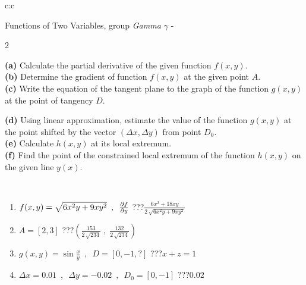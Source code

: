 \documentclass[10pt]{report}
\begin{document}
\begin{tabular}{c:c}
\begin{minipage}[c][104.5mm][t]{0.5\linewidth}
\begin{center}
\vspace{7mm}
{\huge \LARGE Functions of Two Variables, group \textit{Gamma $\gamma$} -}\\[5mm]
\begin{minipage}{0.95\linewidth}
\begin{center}
{\small \begin{multicols}{2} \raggedright
\textbf{(a)} Calculate the partial derivative of the given function \(f(x,y)\). \\[1mm]
\textbf{(b)} Determine the gradient of function \(f(x,y)\) at the given point \(A\). \\[1mm]
\textbf{(c)} Write the equation of the tangent plane to the graph of the function \(g(x,y)\) at the point of tangency \(D\). \par \columnbreak
\textbf{(d)} Using linear approximation, estimate the value of the function \(g(x,y)\) at the point shifted by the vector \((\Delta x, \Delta y)\) from point \(D_0\). \\[1mm]
\textbf{(e)} Calculate \(h(x,y)\) at its local extremum. \\[1mm]
\textbf{(f)} Find the point of the constrained local extremum of the function \(h(x,y)\) on the given line \(y(x)\). \\[1mm]
\end{multicols}
}
\end{center}
\end{minipage}
\\[4mm]
\begin{minipage}{0.79\linewidth}
\begin{center}
\begin{varwidth}{\linewidth}
\begin{enumerate}
\normalsizerr
\item $f(x,y) = \sqrt{6x^2y + 9xy^2}\enspace , \enspace \pdv{f}{y}$\quad \dotfill\; ???\;\dotfill \quad $\frac{6x^2+18xy}{2\,\sqrt{6x^2y+9xy^2}}$
\item $A = [2, 3]$\quad \dotfill\; ???\;\dotfill \quad $\left( \frac{153}{2\,\sqrt{234}} \;,\; \frac{132}{2\,\sqrt{234}} \right)$
\item $g(x,y) = \sin\frac{x}{y} \enspace , \enspace D = [0, -1, ?]$\quad \dotfill\; ???\;\dotfill \quad $x+z=1$
\item $\Delta x = {0.01} \enspace,\enspace \Delta y = {-0.02} \enspace,\enspace D_0 = [0,-1]$\quad \dotfill\; ???\;\dotfill \quad $0.02$

\end{enumerate}
\end{varwidth}
\end{center}
\end{minipage}
\end{center}
\end{minipage}
\end{tabular}
\end{document}
